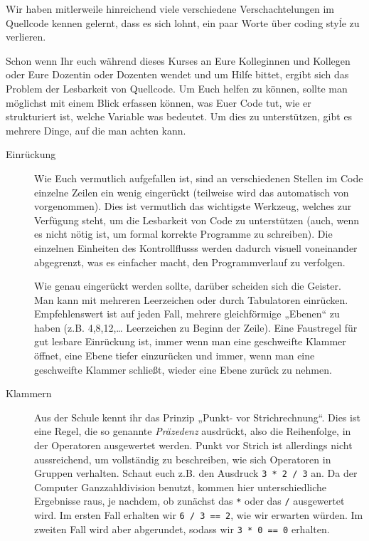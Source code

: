 
Wir haben mitlerweile hinreichend viele verschiedene Verschachtelungen im
Quellcode kennen gelernt, dass es sich lohnt, ein paar Worte über coding styĺe
zu verlieren.

Schon wenn Ihr euch während dieses Kurses an Eure Kolleginnen und Kollegen oder
Eure Dozentin oder Dozenten wendet und um Hilfe bittet, ergibt sich das Problem
der Lesbarkeit von Quellcode. Um Euch helfen zu können, sollte man möglichst mit
einem Blick erfassen können, was Euer Code tut, wie er strukturiert ist, welche
Variable was bedeutet. Um dies zu unterstützen, gibt es mehrere Dinge, auf die
man achten kann.

\begin{description}
\item[Einrückung] Wie Euch vermutlich aufgefallen ist, sind an verschiedenen
  Stellen im Code einzelne Zeilen ein wenig eingerückt (teilweise wird das
  automatisch von \Eclipse vorgenommen). Dies ist vermutlich das wichtigste
  Werkzeug, welches zur Verfügung steht, um die Lesbarkeit von Code zu
  unterstützen (auch, wenn es nicht nötig ist, um formal korrekte Programme zu
  schreiben). Die einzelnen Einheiten des Kontrollflusss werden dadurch visuell
  voneinander abgegrenzt, was es einfacher macht, den Programmverlauf zu
  verfolgen.

  Wie genau eingerückt werden sollte, darüber scheiden sich die Geister. Man
  kann mit mehreren Leerzeichen oder durch Tabulatoren einrücken. Empfehlenswert
  ist auf jeden Fall, mehrere gleichförmige „Ebenen“ zu haben (z.B. 4,8,12,\dots
  Leerzeichen zu Beginn der Zeile). Eine Faustregel für gut lesbare Einrückung
  ist, immer wenn man eine geschweifte Klammer öffnet, eine Ebene tiefer
  einzurücken und immer, wenn man eine geschweifte Klammer schließt, wieder eine
  Ebene zurück zu nehmen.
\item[Klammern]
  Aus der Schule kennt ihr das Prinzip „Punkt- vor Strichrechnung“. Dies ist
  eine Regel, die so genannte \emph{Präzedenz} ausdrückt, also die Reihenfolge,
  in der Operatoren ausgewertet werden. Punkt vor Strich ist allerdings nicht
  aussreichend, um vollständig zu beschreiben, wie sich Operatoren in Gruppen
  verhalten. Schaut euch z.B. den Ausdruck \texttt{3 * 2 / 3} an. Da der
  Computer Ganzzahldivision benutzt, kommen hier unterschiedliche Ergebnisse
  raus, je nachdem, ob zunächst das \texttt{*} oder das \texttt{/} ausgewertet
  wird. Im ersten Fall erhalten wir \texttt{6 / 3 == 2}, wie wir erwarten
  würden. Im zweiten Fall wird aber abgerundet, sodass wir \texttt{3 * 0 == 0}
  erhalten.


\end{description}
